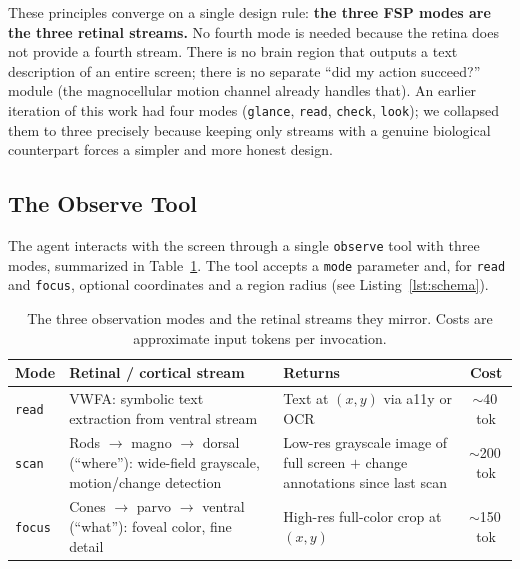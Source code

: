 \documentclass[11pt,a4paper]{article}
\begin{document}
\medskip
\noindent
These principles converge on a single design rule: \textbf{the three FSP modes
are the three retinal streams.} No fourth mode is needed because the retina
does not provide a fourth stream. There is no brain region that outputs a text
description of an entire screen; there is no separate ``did my action
succeed?'' module (the magnocellular motion channel already handles that). An
earlier iteration of this work had four modes (\texttt{glance}, \texttt{read},
\texttt{check}, \texttt{look}); we collapsed them to three precisely because
keeping only streams with a genuine biological counterpart forces a simpler
and more honest design.

\subsection{The Observe Tool}
\label{sec:observe-tool}

The agent interacts with the screen through a single \texttt{observe} tool
with three modes, summarized in Table~\ref{tab:modes}. The tool accepts a
\texttt{mode} parameter and, for \texttt{read} and \texttt{focus}, optional
coordinates and a region radius (see Listing~\ref{lst:schema}).

\begin{table}[t]
\centering
\caption{The three observation modes and the retinal streams they mirror.
Costs are approximate input tokens per invocation.}
\label{tab:modes}
\small
\begin{tabular}{@{}lp{4.5cm}p{4.3cm}c@{}}
\toprule
\textbf{Mode} & \textbf{Retinal / cortical stream} & \textbf{Returns} & \textbf{Cost} \\
\midrule
\texttt{read} & VWFA: symbolic text extraction from ventral stream &
  Text at $(x,y)$ via a11y or OCR & $\sim$40\,tok \\
\texttt{scan} & Rods $\to$ magno $\to$ dorsal (``where''): wide-field grayscale,
  motion/change detection &
  Low-res grayscale image of full screen $+$ change annotations since last scan &
  $\sim$200\,tok \\
\texttt{focus} & Cones $\to$ parvo $\to$ ventral (``what''): foveal color,
  fine detail &
  High-res full-color crop at $(x,y)$ & $\sim$150\,tok \\
\bottomrule
\end{tabular}
\end{table}
\end{document}
